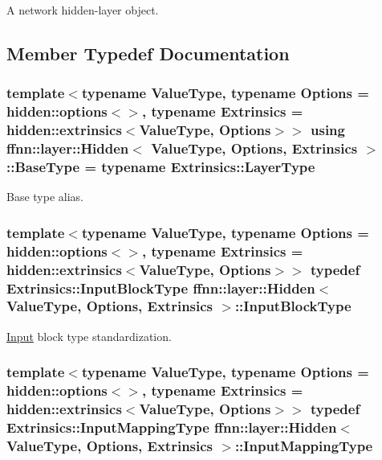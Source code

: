 A network hidden-\/layer object. 

\subsection{Member Typedef Documentation}
\hypertarget{classffnn_1_1layer_1_1_hidden_af146958f4a1b59faba4ae2b2eb521faf}{
\subsubsection[{Base\-Type}]{\setlength{\rightskip}{0pt plus 5cm}template$<$typename Value\-Type, typename Options = hidden\-::options$<$$>$, typename Extrinsics = hidden\-::extrinsics$<$\-Value\-Type, Options$>$$>$ using {\bf ffnn\-::layer\-::\-Hidden}$<$ Value\-Type, Options, Extrinsics $>$\-::{\bf Base\-Type} =  typename Extrinsics\-::\-Layer\-Type}}\label{classffnn_1_1layer_1_1_hidden_af146958f4a1b59faba4ae2b2eb521faf}


Base type alias. 

\hypertarget{classffnn_1_1layer_1_1_hidden_abd5a3b5c55984948f903fe88759efaf4}{
\subsubsection[{Input\-Block\-Type}]{\setlength{\rightskip}{0pt plus 5cm}template$<$typename Value\-Type, typename Options = hidden\-::options$<$$>$, typename Extrinsics = hidden\-::extrinsics$<$\-Value\-Type, Options$>$$>$ typedef Extrinsics\-::\-Input\-Block\-Type {\bf ffnn\-::layer\-::\-Hidden}$<$ Value\-Type, Options, Extrinsics $>$\-::{\bf Input\-Block\-Type}}}\label{classffnn_1_1layer_1_1_hidden_abd5a3b5c55984948f903fe88759efaf4}


\hyperlink{classffnn_1_1layer_1_1_input}{Input} block type standardization. 

\hypertarget{classffnn_1_1layer_1_1_hidden_ac518f2e2be1250c1af7b2f8574cadc8d}{
\subsubsection[{Input\-Mapping\-Type}]{\setlength{\rightskip}{0pt plus 5cm}template$<$typename Value\-Type, typename Options = hidden\-::options$<$$>$, typename Extrinsics = hidden\-::extrinsics$<$\-Value\-Type, Options$>$$>$ typedef Extrinsics\-::\-Input\-Mapping\-Type {\bf ffnn\-::layer\-::\-Hidden}$<$ Value\-Type, Options, Extrinsics $>$\-::{\bf Input\-Mapping\-Type}}}\label{classffnn_1_1layer_1_1_hidden_ac518f2e2be1250c1af7b2f8574cadc8d}



